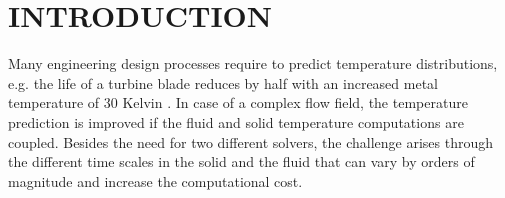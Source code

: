 \section{INTRODUCTION}
Many engineering design processes require to predict temperature distributions, e.g. the life of a turbine blade reduces by half with an increased metal temperature of 30 Kelvin \cite{Han}.  In case of a complex flow field, the temperature prediction is improved if the fluid and solid temperature computations are coupled. Besides the need for two different solvers, the challenge arises through the different time scales in the solid and the fluid that can vary by orders of magnitude and increase the computational cost. 